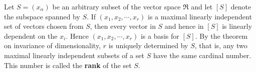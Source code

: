 Let $S = (x_\alpha)$ be an arbitrary subset of the vector space $\Re$ and let $[S]$ denote the subspace spanned by $S$. If $(x_1, x_2, \cdots, x_r)$ is a maximal linearly independent set of vectors chosen from $S$, then every vector in $S$ and hence in $[S]$ is linearly dependent on the $x_i$. Hence $(x_1, x_2, \cdots, x_r)$ is a basis for $[S]$. By the theorem on invariance of dimensionality, $r$ is uniquely determined by $S$, that is, any two maximal linearly independent subsets of a set $S$ have the same cardinal number. This number is called the \textbf{rank} of the set $S$.

